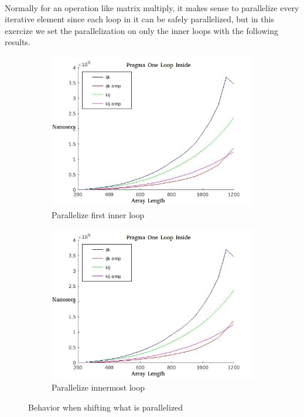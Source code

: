 \documentclass[10pt,8.5in,11in]{article}
\begin{document}
	\paragraph{}	
	Normally for an operation like matrix multiply, it makes sense to parallelize every iterative element since each loop in it can be safely parallelized, but in this exercize we set the parallelization on only the inner loops with the following results.
	
	\begin{figure}[h!]
	\centering
	\begin{subfigure}{.5\textwidth}
  		\centering
  		\includegraphics[width=\linewidth]{part3c_one}
  		\caption{Parallelize first inner loop}
	\end{subfigure}%
	\begin{subfigure}{.5\textwidth}
  		\centering
  		\includegraphics[width=\linewidth]{part3c_one}
  		\caption{Parallelize innermost loop}
	\end{subfigure}	
	\caption{Behavior when shifting what is parallelized}
	\end{figure}
	
\end{document}
